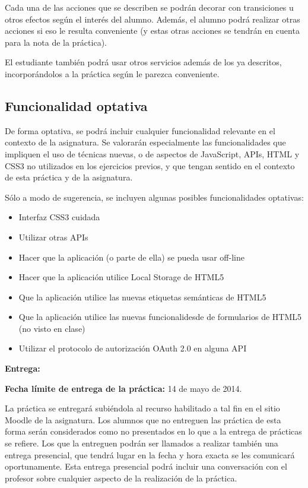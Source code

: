 Cada una de las acciones que se describen se podrán decorar con transiciones u otros efectos según el interés del alumno. Además, el alumno podrá realizar otras acciones si eso le resulta conveniente (y estas otras acciones se tendrán en cuenta para la nota de la práctica).

El estudiante también podrá usar otros servicios además de los ya descritos, incorporándolos a la práctica según le parezca conveniente.

\subsection{Funcionalidad optativa}

De forma optativa, se podrá incluir cualquier funcionalidad relevante en el contexto de la asignatura. Se valorarán especialmente las funcionalidades que impliquen el uso de técnicas nuevas, o de aspectos de JavaScript, APIs, HTML y CSS3 no utilizados en los ejercicios previos, y que tengan sentido en el contexto de esta práctica y de la asignatura.

Sólo a modo de sugerencia, se incluyen algunas posibles funcionalidades optativas:

\begin{itemize}
  \item Interfaz CSS3 cuidada
  \item Utilizar otras APIs
  \item Hacer que la aplicación (o parte de ella) se pueda usar off-line
  \item Hacer que la aplicación utilice Local Storage de HTML5
  \item Que la aplicación utilice las nuevas etiquetas semánticas de HTML5
  \item Que la aplicación utilice las nuevas funcionalidesde de formularios de HTML5 (no visto en clase)
  \item Utilizar el protocolo de autorización OAuth 2.0 en alguna API
\end{itemize}

\textbf{Entrega:}

\textbf{Fecha límite de entrega de la práctica:} 14 de mayo de 2014.

La práctica se entregará subiéndola al recurso habilitado a tal fin en el sitio Moodle de la asignatura. Los alumnos que no entreguen las práctica de esta forma serán considerados como no presentados en lo que a la entrega de prácticas se refiere. Los que la entreguen podrán ser llamados a realizar también una entrega presencial, que tendrá lugar en la fecha y hora exacta se les comunicará oportunamente. Esta entrega presencial podrá incluir una conversación con el profesor sobre cualquier aspecto de la realización de la práctica.

